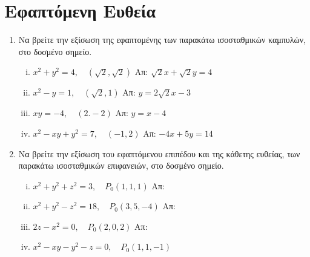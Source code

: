 \documentclass[a4paper,table]{report}
\begin{document}
\begin{center}
\minibox{\large\bfseries \textcolor{Col1}{Εφαπτόμενο Επίπεδο, Εφαπτόμενη και Κάθετη Ευθεία}}
\end{center}

\vspace{\baselineskip}

\section*{Εφαπτόμενη Ευθεία}



\begin{enumerate}
\item Να βρείτε την εξίσωση της εφαπτομένης των παρακάτω ισοσταθμικών καμπυλών, στο
  δοσμένο σημείο.
  \begin{enumerate}[i)]
    \item $ x^{2}+y^{2} = 4, \quad (\sqrt{2} , \sqrt{2}) $ 
      \hfill Απ: $ \sqrt{2} x + \sqrt{2} y = 4 $
    \item $ x^{2}-y=1, \quad (\sqrt{2} ,1) $ \hfill Απ: $ y=2 \sqrt{2} x - 3 $
    \item $ xy=-4, \quad (2.-2) $ \hfill Απ: $ y=x-4 $
    \item $ x^{2}-xy+y^{2}=7, \quad (-1,2) $ \hfill Απ: $ -4x+5y=14 $
  \end{enumerate}

\item Να βρείτε την εξίσωση του εφαπτόμενου επιπέδου και της κάθετης ευθείας, των 
  παρακάτω ισοσταθμικών επιφανειών, στο δοσμένο σημείο.
  \begin{enumerate}[i)]
    \item $ x^{2}+y^{2}+z^{2}=3, \quad P_{0}(1,1,1) $ \hfill Απ:  
    \item $ x^{2}+y^{2}-z^{2}=18, \quad P_{0}(3,5,-4) $ \hfill Απ: 
    \item $ 2z-x^{2}=0, \quad P_{0}(2,0,2) $ \hfill Απ: 
    \item $ x^{2}-xy-y^{2}-z=0, \quad P_{0}(1,1,-1) $
  \end{enumerate}
\end{enumerate}
\end{document}
